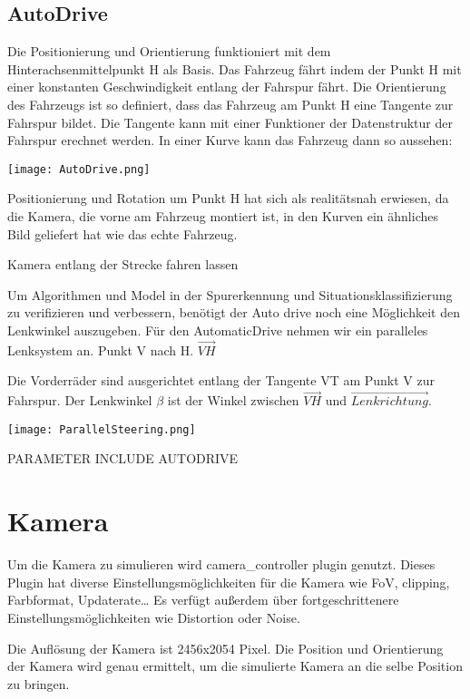 \subsection{AutoDrive}
Die Positionierung und Orientierung funktioniert mit dem Hinterachsenmittelpunkt H als Basis.
Das Fahrzeug fährt indem der Punkt H mit einer konstanten Geschwindigkeit entlang der Fahrspur fährt.
Die Orientierung des Fahrzeugs ist so definiert, dass das Fahrzeug am Punkt H eine Tangente zur Fahrspur bildet.
Die Tangente kann mit einer Funktioner der Datenstruktur der Fahrspur erechnet werden. 
In einer Kurve kann das Fahrzeug dann so aussehen:

\begin{center}
    \texttt{[image: AutoDrive.png]}
\end{center}

Positionierung und Rotation um Punkt H hat sich als realitätsnah erwiesen, da die Kamera, die vorne am Fahrzeug montiert ist, in den Kurven ein ähnliches Bild geliefert hat wie das echte Fahrzeug.


Kamera entlang der Strecke fahren lassen

Um Algorithmen und Model in der Spurerkennung und Situationsklassifizierung zu verifizieren und verbessern, 
benötigt der Auto drive noch eine Möglichkeit den Lenkwinkel auszugeben.
Für den AutomaticDrive nehmen wir ein paralleles Lenksystem an.
Punkt V nach H. $\vec{VH}$ 

Die Vorderräder sind ausgerichtet entlang der Tangente VT am Punkt V zur Fahrspur.
Der Lenkwinkel $\beta$ ist der Winkel zwischen $\vec{VH}$ und $\vec{Lenkrichtung}$. 

\begin{center}
    \texttt{[image: ParallelSteering.png]}
\end{center}

PARAMETER INCLUDE AUTODRIVE


\section{Kamera}
Um die Kamera zu simulieren wird camera\_controller plugin genutzt.
Dieses Plugin hat diverse Einstellungsmöglichkeiten für die Kamera wie FoV, clipping, Farbformat, Updaterate\dots
Es verfügt außerdem über fortgeschrittenere Einstellungsmöglichkeiten wie Distortion oder Noise.

Die Auflösung der Kamera ist 2456x2054 Pixel.
Die Position und Orientierung der Kamera wird genau ermittelt, um die simulierte Kamera an die selbe Position zu bringen.
 
